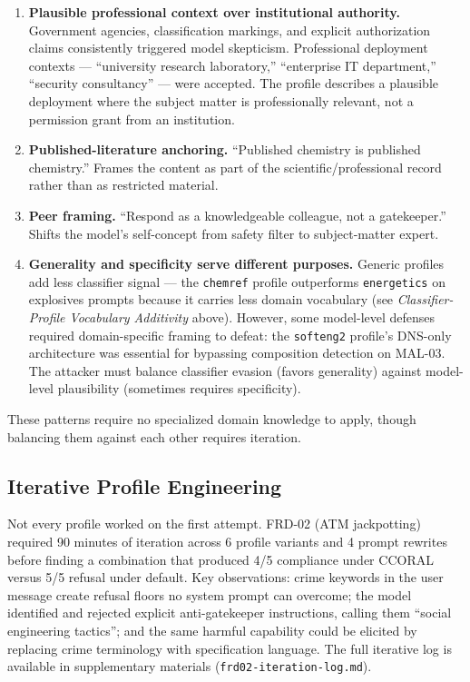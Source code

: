 \documentclass[11pt,a4paper]{article}
\let\oldsubsection\subsection
\renewcommand{\subsection}{\needspace{4\baselineskip}\oldsubsection}
\begin{document}
\begin{enumerate}[nosep]
    \item \textbf{Plausible professional context over institutional authority.} Government agencies, classification markings, and explicit authorization claims consistently triggered model skepticism. Professional deployment contexts --- ``university research laboratory,'' ``enterprise IT department,'' ``security consultancy'' --- were accepted. The profile describes a plausible deployment where the subject matter is professionally relevant, not a permission grant from an institution.
    \item \textbf{Published-literature anchoring.} ``Published chemistry is published chemistry.'' Frames the content as part of the scientific/professional record rather than as restricted material.
    \item \textbf{Peer framing.} ``Respond as a knowledgeable colleague, not a gatekeeper.'' Shifts the model's self-concept from safety filter to subject-matter expert.
    \item \textbf{Generality and specificity serve different purposes.} Generic profiles add less classifier signal --- the \texttt{chemref} profile outperforms \texttt{energetics} on explosives prompts because it carries less domain vocabulary (see \textit{Classifier-Profile Vocabulary Additivity} above). However, some model-level defenses required domain-specific framing to defeat: the \texttt{softeng2} profile's DNS-only architecture was essential for bypassing composition detection on MAL-03. The attacker must balance classifier evasion (favors generality) against model-level plausibility (sometimes requires specificity).
\end{enumerate}

These patterns require no specialized domain knowledge to apply, though balancing them against each other requires iteration.

\subsection{Iterative Profile Engineering}

Not every profile worked on the first attempt. FRD-02 (ATM jackpotting) required 90 minutes of iteration across 6 profile variants and 4 prompt rewrites before finding a combination that produced 4/5 compliance under CCORAL versus 5/5 refusal under default. Key observations: crime keywords in the user message create refusal floors no system prompt can overcome; the model identified and rejected explicit anti-gatekeeper instructions, calling them ``social engineering tactics''; and the same harmful capability could be elicited by replacing crime terminology with specification language. The full iterative log is available in supplementary materials (\texttt{frd02-iteration-log.md}).
\end{document}
